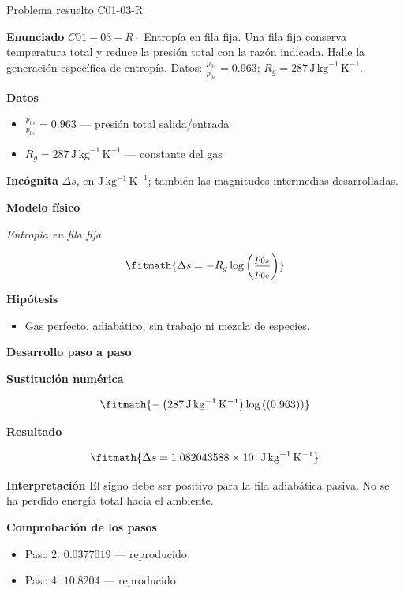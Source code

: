 \documentclass[10pt,openany]{book}
\begin{document}
\begin{studiumworked}{Problema resuelto C01-03-R}


\noindent\textbf{Enunciado}
\(C01-03-R \cdot\) Entropía en fila fija. Una fila fija conserva temperatura total y reduce la presión total con la razón indicada. Halle la generación específica de entropía. Datos: \(\frac{p_{0s}}{p_{0e}}=0.963\); \(R_g=287\, \mathrm{J}\,\mathrm{kg}^{-1}\,\mathrm{K}^{-1}\).

\noindent\textbf{Datos}
\begin{itemize}
\item $\frac{p_{0s}}{p_{0e}} = 0.963$ — presión total salida/entrada
\item $R_g = 287\,\mathrm{J}\,\mathrm{kg}^{-1}\,\mathrm{K}^{-1}$ — constante del gas
\end{itemize}

\noindent\textbf{Incógnita}
$\Delta s$, en $\mathrm{J\,kg^{-1}\,K^{-1}}$; también las magnitudes intermedias desarrolladas.

\noindent\textbf{Modelo físico}

\noindent\textit{Entropía en fila fija}

\[
\fitmath{\Delta s=- R_g \log{\left(\frac{p_{0s}}{p_{0e}} \right)}}
\]

\noindent\textbf{Hipótesis}
\begin{itemize}
\item Gas perfecto, adiabático, sin trabajo ni mezcla de especies.
\end{itemize}

\noindent\textbf{Desarrollo paso a paso}



\noindent\textbf{Sustitución numérica}

\[
\fitmath{- \left(287\,\mathrm{J}\,\mathrm{kg}^{-1}\,\mathrm{K}^{-1}\right) \log{\left(\left(0.963\right) \right)}}
\]

\noindent\textbf{Resultado}

\[
\fitmath{\Delta s=1.082043588\times10^{1}\,\mathrm{J}\,\mathrm{kg}^{-1}\,\mathrm{K}^{-1}}
\]

\noindent\textbf{Interpretación}
El signo debe ser positivo para la fila adiabática pasiva. No se ha perdido energía total hacia el ambiente.

\noindent\textbf{Comprobación de los pasos}
\begin{itemize}
\item Paso 2: $0.0377019$ — reproducido
\item Paso 4: $10.8204$ — reproducido
\end{itemize}


\end{studiumworked}
\end{document}
